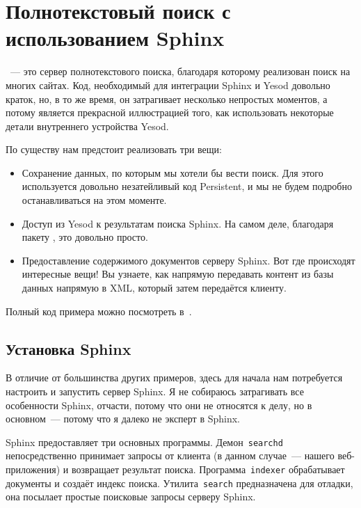 \chapter{Полнотекстовый поиск с использованием Sphinx}\label{chap:sphinx}
~--- это сервер полнотекстового
поиска, благодаря которому реализован поиск на многих сайтах. Код, необходимый
для интеграции Sphinx и Yesod довольно краток, но, в то же время, он
затрагивает несколько непростых моментов, а потому является прекрасной
иллюстрацией того, как использовать некоторые детали внутреннего устройства
Yesod.

По существу нам предстоит реализовать три вещи:
\begin{itemize}
  \item Сохранение данных, по которым мы хотели бы вести поиск. Для этого
      используется довольно незатейливый код Persistent, и мы не будем подробно
      останавливаться на этом моменте.

  \item Доступ из Yesod к результатам поиска Sphinx. На самом деле, благодаря
      пакету ,
      это довольно просто.

  \item Предоставление содержимого документов серверу Sphinx. Вот где
      происходят интересные вещи! Вы узнаете, как напрямую передавать контент
      из базы данных напрямую в XML, который затем передаётся клиенту.
\end{itemize}

Полный код примера можно посмотреть
в~.

\section{Установка Sphinx}
В отличие от большинства других примеров, здесь для начала нам потребуется
настроить и запустить сервер Sphinx. Я не собираюсь затрагивать все особенности
Sphinx, отчасти, потому что они не относятся к делу, но в основном~--- потому
что я далеко не эксперт в Sphinx.

Sphinx предоставляет три основных программы. Демон~\lstinline!searchd!
непосредственно принимает запросы от клиента (в данном случае~--- нашего
веб-приложения) и возвращает результат поиска. Программа~\lstinline!indexer!
обрабатывает документы и создаёт индекс поиска. Утилита~\lstinline!search!
предназначена для отладки, она посылает простые поисковые запросы серверу
Sphinx.

